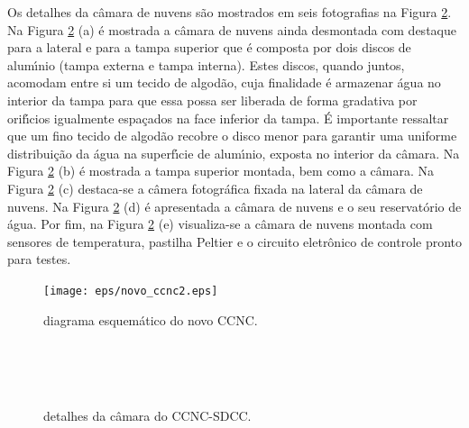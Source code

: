 Os detalhes da c\^{a}mara de nuvens s\~{a}o mostrados em seis fotografias na Figura \ref{6figs}. Na Figura \ref{6figs} (a) \'{e} mostrada a c\^{a}mara de nuvens ainda desmontada com destaque para a lateral e para a tampa superior que \'{e} composta por dois discos de alum\'{\i}nio (tampa externa e tampa interna). Estes discos, quando juntos, acomodam entre si um tecido de algod\~{a}o, cuja finalidade \'{e} armazenar \'{a}gua no interior da tampa para que essa possa ser liberada de forma gradativa por orif\'{\i}cios igualmente espa\c{c}ados na face inferior da tampa. \'{E} importante ressaltar que um fino tecido de algod\~{a}o recobre o disco menor para garantir uma uniforme distribui\c{c}\~{a}o da \'{a}gua na superf\'{\i}cie de alum\'{\i}nio, exposta no interior da c\^{a}mara.  Na Figura \ref{6figs} (b) \'{e} mostrada a tampa superior montada, bem como a c\^{a}mara. Na Figura \ref{6figs} (c) destaca-se a c\^{a}mera fotogr\'{a}fica fixada na lateral da c\^{a}mara de nuvens. Na Figura \ref{6figs} (d) \'{e} apresentada a c\^{a}mara de nuvens e o seu reservat\'{o}rio de \'{a}gua. Por fim, na Figura \ref{6figs} (e) visualiza-se a c\^{a}mara de nuvens montada com sensores de temperatura, pastilha Peltier e o circuito eletr\^{o}nico de controle pronto para testes.




\begin{figure}[!hbt]
\begin{center}
\texttt{[image: eps/novo\_ccnc2.eps]}\\
\end{center}
\caption{\label{novo-ccnc}\hspace{-0.1em} diagrama esquem\'{a}tico do novo CCNC.}
\end{figure}





\begin{figure}%
\centering
{} %
 \\
 \\

\\
\centering \caption{\label{6figs} detalhes da c\^{a}mara do CCNC-SDCC.}
\end{figure}


